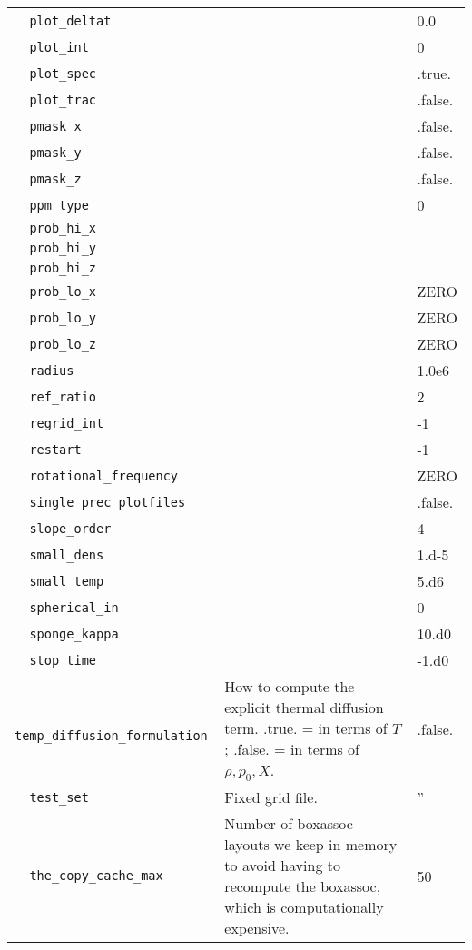 {\begin{center}
\begin{longtable}{|l|p{3.25in}|l|}
\verb=  plot_deltat =  &   &  0.0 \\
\verb=  plot_int =  &   & 0 \\
\verb=  plot_spec =  &   & .true. \\
\verb=  plot_trac =  &   & .false. \\
\verb=  pmask_x =  &   &  .false. \\
\verb=  pmask_y =  &   &  .false. \\
\verb=  pmask_z =  &   &  .false. \\
\verb=  ppm_type =  &   &  0 \\
\verb=  prob_hi_x =  &   &  \\
\verb=  prob_hi_y =  &   &  \\
\verb=  prob_hi_z =  &   &  \\
\verb=  prob_lo_x =  &   &  ZERO \\
\verb=  prob_lo_y =  &   &  ZERO \\
\verb=  prob_lo_z =  &   &  ZERO \\
\verb=  radius =  &   &  1.0e6 \\
\verb=  ref_ratio =  &   &  2 \\
\verb=  regrid_int =  &   &  -1 \\
\verb=  restart =  &   & -1 \\
\verb=  rotational_frequency =  &   &  ZERO \\
\verb=  single_prec_plotfiles =  &   &  .false. \\
\verb=  slope_order =  &   &  4 \\
\verb=  small_dens =  &   &  1.d-5 \\
\verb=  small_temp =  &   &  5.d6 \\
\verb=  spherical_in =  &   &  0 \\
\verb=  sponge_kappa =  &   &  10.d0 \\
\verb=  stop_time =  &   &  -1.d0 \\
\verb=  temp_diffusion_formulation =  & How to compute the explicit thermal diffusion
                                                term.  .true. = in terms of $T$; .false. =
                                                in terms of $\rho,p_0,X$.  &  .false. \\
\verb=  test_set =  & Fixed grid file.  &  '' \\
\verb=  the_copy_cache_max =  & Number of boxassoc layouts we keep in memory to avoid 
                                      having to recompute the boxassoc, which is 
                                      computationally expensive.  & 50 \\

\end{longtable}
\end{center}}
